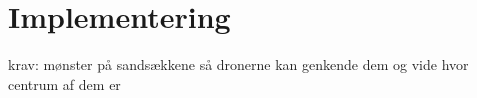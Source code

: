 \chapter{Implementering}\label{ch:implementering}


krav:
mønster på sandsækkene så dronerne kan genkende dem og vide hvor centrum af dem er 
